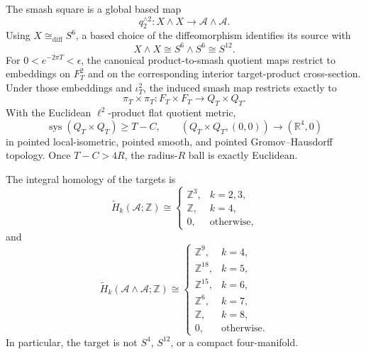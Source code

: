 \begin{theorem}
The smash square is a global based map
\begin{equation}
 q_2^{\wedge2}:X\wedge X\longrightarrow
 \mathcal A\wedge\mathcal A.
 \label{wb:cusp-cone-S12-map}
\end{equation}
Using \(X\cong_{\mathrm{diff}}S^6\), a based choice of the diffeomorphism
identifies its source with
\begin{equation}
 X\wedge X\cong S^6\wedge S^6\cong S^{12}.
 \label{wb:cusp-cone-S12-source}
\end{equation}
For \(0<e^{-2\pi T}<\epsilon\), the canonical product-to-smash quotient
maps restrict to embeddings on \(F_T^2\) and on the corresponding interior
target-product cross-section.  Under those embeddings and \(\iota_T^2\),
the induced smash map restricts exactly to
\begin{equation}
 \pi_T\times\pi_T:F_T\times F_T\longrightarrow Q_T\times Q_T.
 \label{wb:cusp-cone-S12-fibre-map}
\end{equation}
With the Euclidean \(\ell^2\)-product flat quotient metric,
\begin{equation}
 \operatorname{sys}(Q_T\times Q_T)\geq T-C,\qquad
 (Q_T\times Q_T,(0,0))\longrightarrow(\mathbb R^4,0)
 \label{wb:cusp-cone-S12-R4-limit}
\end{equation}
in pointed local-isometric, pointed smooth, and pointed
Gromov--Hausdorff topology.  Once \(T-C>4R\), the radius-\(R\) ball is
exactly Euclidean.

The integral homology of the targets is
\begin{equation}
 \widetilde H_k(\mathcal A;\mathbb Z)\cong
 \begin{cases}
  \mathbb Z^3,&k=2,3,\\
  \mathbb Z,&k=4,\\
  0,&\text{otherwise},
 \end{cases}
 \label{wb:cusp-cone-A-homology}
\end{equation}
and
\begin{equation}
 \widetilde H_k(\mathcal A\wedge\mathcal A;\mathbb Z)\cong
 \begin{cases}
  \mathbb Z^9,&k=4,\\
  \mathbb Z^{18},&k=5,\\
  \mathbb Z^{15},&k=6,\\
  \mathbb Z^6,&k=7,\\
  \mathbb Z,&k=8,\\
  0,&\text{otherwise}.
 \end{cases}
 \label{wb:cusp-cone-A-smash-homology}
\end{equation}
In particular, the target is not \(S^4\), \(S^{12}\), or a compact
four-manifold.
\end{theorem}



